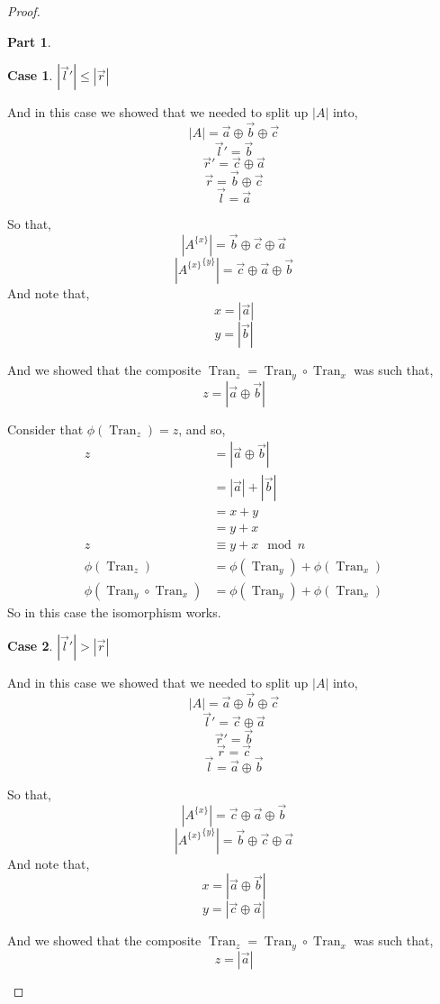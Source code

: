 \documentclass[12pt]{book}
\theoremstyle{plain}
\theoremstyle{definition}
\theoremstyle{ppart}
\newtheorem{ppart}{Part}
\theoremstyle{case}
\newtheorem{case}{Case}
\theoremstyle{solution}
\DeclareMathOperator{\Tran}{Tran}
\newcommand{\shape}[1]{\left|#1\right|}
\newcommand{\transpose}[2]{{#1}^{\{#2\}}}
\begin{document}
\begin{proof}
\begin{ppart}
\setcounter{case}{0}
\begin{case} $\shape{\vec{l}'} \le \shape{\vec{r}}$

And in this case we showed that we needed to split up $\shape{A}$ into,
\[ \shape{A} = \vec{a} \oplus \vec{b} \oplus \vec{c} \]
\[ \vec{l}' = \vec{b} \]
\[ \vec{r}' = \vec{c} \oplus \vec{a} \]
\[ \vec{r} = \vec{b} \oplus \vec{c} \]
\[ \vec{l} = \vec{a} \]

So that,
\[ \shape{\transpose{A}{x}} = \vec{b} \oplus \vec{c} \oplus \vec{a} \]
\[ \shape{\transpose{\transpose{A}{x}}{y}} = \vec{c} \oplus \vec{a} \oplus \vec{b} \]
And note that,
\[ x = \shape{\vec{a}} \]
\[ y = \shape{\vec{b}} \]

And we showed that the composite $\Tran_z = \Tran_y \circ \Tran_x$ was such
that,
\[ z = \shape{\vec{a} \oplus \vec{b}} \]

Consider that $\phi(\Tran_z) = z$, and so,
\begin{align*}
  z
  &= \shape{\vec{a} \oplus \vec{b}} \\
  &= \shape{\vec{a}} + \shape{\vec{b}} \\
  &= x + y \\
  &= y + x \\
  z &\equiv y + x \mod n \\
  \phi(\Tran_z) &= \phi(\Tran_y) + \phi(\Tran_x) \\
  \phi(\Tran_y \circ \Tran_x) &= \phi(\Tran_y) + \phi(\Tran_x)
\end{align*}
So in this case the isomorphism works.
\end{case}

\begin{case} $\shape{\vec{l}'} > \shape{\vec{r}}$

And in this case we showed that we needed to split up $\shape{A}$ into,
\[ \shape{A} = \vec{a} \oplus \vec{b} \oplus \vec{c} \]
\[ \vec{l}' = \vec{c} \oplus \vec{a} \]
\[ \vec{r}' = \vec{b} \]
\[ \vec{r} = \vec{c} \]
\[ \vec{l} = \vec{a} \oplus \vec{b} \]

So that,
\[ \shape{\transpose{A}{x}} = \vec{c} \oplus \vec{a} \oplus \vec{b} \]
\[ \shape{\transpose{\transpose{A}{x}}{y}} = \vec{b} \oplus \vec{c} \oplus \vec{a} \]
And note that,
\[ x = \shape{\vec{a} \oplus \vec{b}} \]
\[ y = \shape{\vec{c} \oplus \vec{a}} \]

And we showed that the composite $\Tran_z = \Tran_y \circ \Tran_x$ was such
that,
\[ z = \shape{\vec{a}} \]


\end{case}
\end{ppart}
\end{proof}
\end{document}
